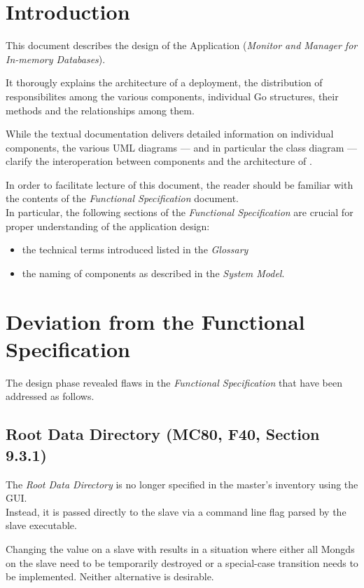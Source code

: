 \section{Introduction}

This document describes the design of the Application \mamid (\emph{Monitor and Manager for In-memory Databases}).

It thorougly explains the architecture of a \mamid deployment, the distribution of responsibilites among the various components,
individual Go structures, their methods and the relationships among them.

While the textual documentation delivers detailed information on individual components, the various UML diagrams
--- and in particular the class diagram --- clarify the interoperation between components and the architecture of \mamid.

In order to facilitate lecture of this document, the reader should be familiar with the contents of the \emph{Functional Specification}
document.\\
In particular, the following sections of the \emph{Functional Specification} are crucial for proper understanding of the
application design:
\begin{itemize}
  \item the technical terms introduced listed in the \emph{Glossary}
  \item the naming of \mamid components as described in the \emph{System Model}.
\end{itemize}

\section{Deviation from the Functional Specification}

The design phase revealed flaws in the \emph{Functional Specification} that have been addressed as follows.

\subsection{Root Data Directory (MC80, F40, Section 9.3.1)}

The \emph{Root Data Directory} is no longer specified in the master's inventory using the GUI.\\
Instead, it is passed directly to the slave via a command line flag parsed by the slave executable.

Changing the value on a slave with   results in a situation where either
all Mongds on the slave need to be temporarily destroyed or a special-case transition needs to be implemented.
Neither alternative is desirable.


